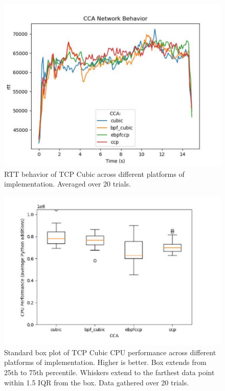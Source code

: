 \documentclass[../main.tex]{subfiles}
\begin{document}
\begin{figure}[t]
    \centering
        \includegraphics[width=\columnwidth]{img/cca-behavior-rtt}
        \caption{RTT behavior of TCP Cubic across different platforms of implementation. Averaged over 20 trials.
        }\label{fig:cca-behavior-rtt}
    \end{figure}

\begin{figure}[t]
    \centering
        \includegraphics[width=\columnwidth]{img/cca-performance}
        \caption{Standard box plot of TCP Cubic CPU performance across different platforms of implementation. Higher is better. Box extends from 25th to 75th percentile. Whiskers extend to the farthest data point within 1.5 IQR from the box. Data gathered over 20 trials.
        }\label{fig:cca-performance}
    \end{figure}
\end{document}
